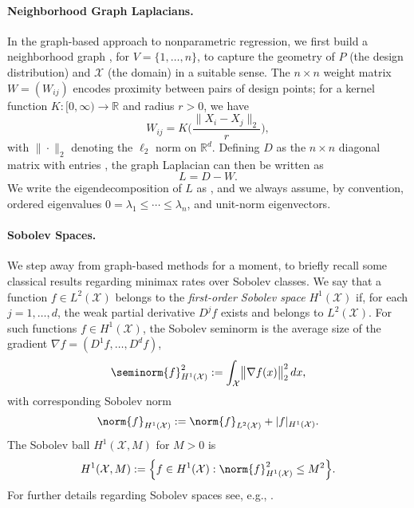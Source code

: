 \documentclass[twoside]{article}
\newcommand{\Reals}{\mathbb{R}}
\newcommand{\1}{\mathbf{1}}
\newcommand{\Rd}{\Reals^d}
\newcommand{\Lap}{L}
\newcommand{\Xset}{\mathcal{X}}
\newcommand{\Leb}{L}
\theoremstyle{definition}
\theoremstyle{remark}
\begin{document}
\paragraph{Neighborhood Graph Laplacians.}

In the graph-based approach to nonparametric regression, we first build a neighborhood graph , for $V=\{1,\ldots,n\}$, to capture the geometry of $P$ (the design distribution) and $\Xset$ (the domain) in a suitable sense. The $n \times n$ weight matrix $W = (W_{ij})$ encodes proximity between pairs of design points; for a kernel function $K: [0,\infty) \to \Reals$ and radius $r > 0$, we have
\begin{equation*}
\label{eqn:neighborhood_graph}
W_{ij} = K\Biggl(\frac{\|X_i - X_j\|_2}{r}\Biggr),
\end{equation*}
with $\|\cdot\|_2$ denoting the $\ell_2$ norm on $\Rd$. Defining $D$ as the $n \times n$ diagonal matrix with entries , the graph Laplacian can then be written as
\begin{equation}
\label{eqn:graph_Laplacian}
\Lap = D - W.
\end{equation}
We write the eigendecomposition of $L$ as , and we always assume, by convention, ordered eigenvalues $0 = \lambda_1 \leq \cdots \leq \lambda_n$, and unit-norm eigenvectors.


\paragraph{Sobolev Spaces.}

We step away from graph-based methods for a moment, to briefly recall some classical results regarding minimax rates over Sobolev classes. We say that a function $f \in \Leb^2(\Xset)$ belongs to the \emph{first-order Sobolev space} $H^1(\Xset)$ if, for each $j = 1,\ldots,d$, the weak partial derivative $D^j f$ exists and belongs to $\Leb^2(\Xset)$. For such functions $f \in H^1(\Xset)$, the Sobolev seminorm \smash{$\seminorm{f}_{H^{1}(\Xset)}$} is the average size of the gradient $\nabla f = (D^1 f, \ldots, D^d f)$, 
\begin{equation*}
\seminorm{f}_{H^1(\Xset)}^2 := \int_{\Xset} \bigl\|\nabla f(x)\bigr\|_2^2 \,dx,
\end{equation*}
with corresponding Sobolev norm 
\begin{equation*}
\norm{f}_{H^1(\Xset)} := \norm{f}_{\Leb^2(\Xset)} + |f|_{H^1(\Xset)}.
\end{equation*}
The Sobolev ball $H^1(\Xset,M)$ for $M > 0$ is
\begin{equation*}
H^1(\Xset,M) := \Bigl\{f \in H^1(\Xset): \norm{f}_{H^1(\Xset)}^2 \leq M^2\Bigr\}.
\end{equation*}
For further details regarding Sobolev spaces see, e.g., \citet{evans10,leoni2017}.
\end{document}
